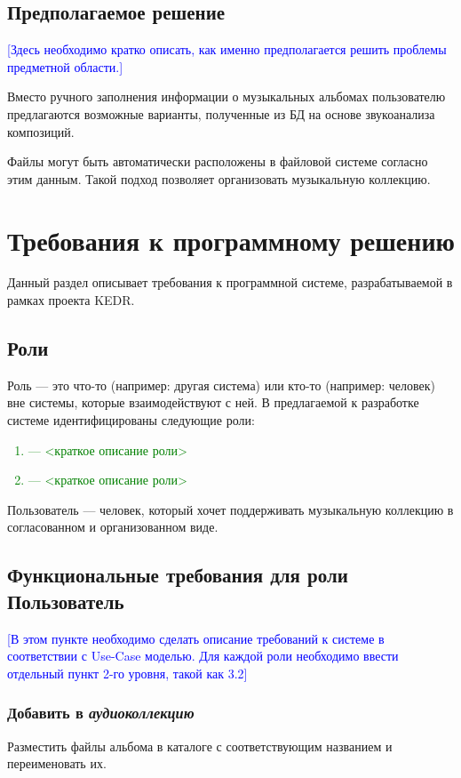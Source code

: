 \documentclass[pdftex,12pt,a4paper]{report}
\providecommand{\comment}[1]{\textcolor{blue}{#1}}
\providecommand{\replace}[1]{\textcolor{green}{#1}}
\begin{document}
\subsection{Предполагаемое решение}
\comment{[Здесь необходимо кратко описать, как именно предполагается решить проблемы предметной области.]}

Вместо ручного заполнения информации о музыкальных альбомах пользователю предлагаются возможные варианты, полученные из БД на основе звукоанализа композиций.

Файлы могут быть автоматически расположены в файловой системе согласно этим данным.
Такой подход позволяет организовать музыкальную коллекцию.

\section{Требования к программному решению}
Данный раздел описывает требования к программной системе, разрабатываемой в рамках проекта KEDR.

\subsection{Роли}
Роль --- это что-то (например: другая система) или кто-то (например: человек) вне системы, которые взаимодействуют с ней. В предлагаемой к разработке системе идентифицированы следующие роли:
\replace{
	\begin{enumerate}
		\item <Роль1> --- <краткое описание роли>
		\item <Роль2> --- <краткое описание роли>
	\end{enumerate}
}

Пользователь --- человек, который хочет поддерживать музыкальную коллекцию в согласованном и организованном виде.

\subsection{Функциональные требования для роли Пользователь}
\comment{[В этом пункте необходимо сделать описание требований к системе в соответствии с Use-Case моделью. Для каждой роли необходимо ввести отдельный пункт 2-го уровня, такой как 3.2]}

\subsubsection{Добавить в {\it аудиоколлекцию}}
Разместить файлы альбома в каталоге с соответствующим названием и переименовать их.
\end{document}
